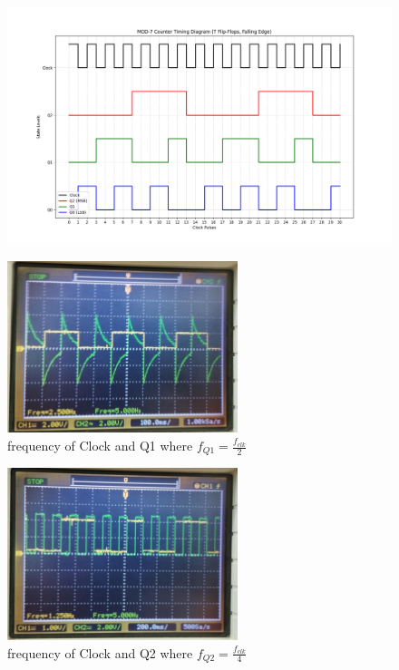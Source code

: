 \documentclass[a4paper,12pt]{article}
\begin{document}
\begin{figure}[H]
\centering
\includegraphics[width=\textwidth]{figs/Plot.png}
\end{figure}
\begin{figure}[H]
\centering
\includegraphics[width=0.6\textwidth]{figs/fig1.jpeg}
\caption{frequency of Clock and Q1 where $f_{Q1} = \frac{f_{clk}}{2}$}
\end{figure}
\begin{figure}[H]
\centering
\includegraphics[width=0.6\textwidth]{figs/fig2.jpeg}
\caption{frequency of Clock and Q2 where $f_{Q2} = \frac{f_{clk}}{4}$}
\end{figure}
\end{document}
